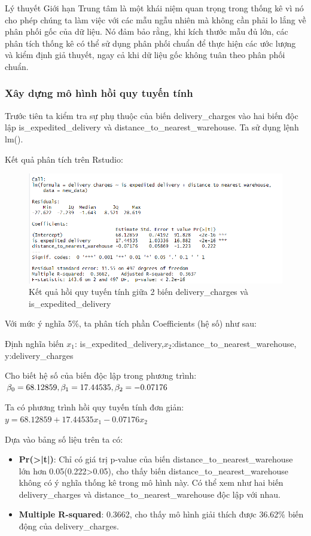 Lý thuyết Giới hạn Trung tâm là một khái niệm quan trọng trong thống kê vì nó cho phép chúng ta làm việc với các mẫu ngẫu nhiên mà không cần phải lo lắng về phân phối gốc của dữ liệu. Nó đảm bảo rằng, khi kích thước mẫu đủ lớn, các phân tích thống kê có thể sử dụng phân phối chuẩn để thực hiện các ước lượng và kiểm định giả thuyết, ngay cả khi dữ liệu gốc không tuân theo phân phối chuẩn.
\subsubsection{Xây dựng mô hình hồi quy tuyến tính}
Trước tiên ta kiểm tra sự phụ thuộc của biến delivery\_charges vào hai biến độc lập is\_expedited\_delivery và distance\_to\_nearest\_warehouse. Ta sử dụng lệnh lm().

Kết quả phân tích trên Rstudio:
\begin{figure}[H]
  \centering
  \includegraphics[width=0.7\linewidth]{graphics/5.5.1.png}
  \caption{Kết quả hồi quy tuyến tính giữa 2 biến delivery\_charges và is\_expedited\_delivery  }
\end{figure}


Với mức ý nghĩa 5\%, ta phân tích phần Coefficients (hệ số) như sau:

Định nghĩa biến $x_1$: is\_expedited\_delivery,$x_2$:distance\_to\_nearest\_warehouse, y:delivery\_charges

Cho biết hệ số của biến độc lập trong phương trình: $\beta_0= 68.12859, \beta_1= 17.44535,\\ \beta_2= -0.07176 $
 
Ta có phương trình hồi quy tuyến tính đơn giản: $y= 68.12859 + 17.44535x_1 - 0.07176x_2$

 Dựa vào bảng số liệu trên ta có:\\
 \begin{itemize}
 \item\textbf{Pr(>|t|)}: Chỉ có giá trị p-value của biến distance\_to\_nearest\_warehouse lớn hơn 0.05(0.222>0.05), cho thấy biến distance\_to\_nearest\_warehouse không có ý nghĩa thống kê trong mô hình này. Có thể xem như hai biến delivery\_charges và distance\_to\_nearest\_warehouse độc lập với nhau.
\item\textbf{Multiple R-squared}: 0.3662, cho thấy mô hình giải thích được 36.62\% biến động của delivery\_charges.
 \end{itemize}

